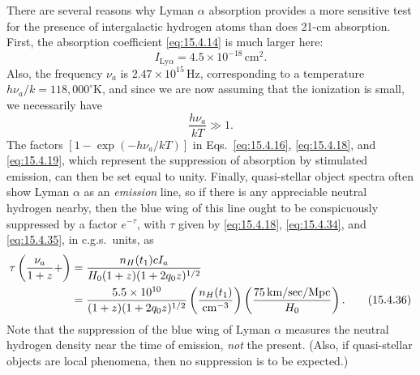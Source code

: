 There are several reasons why Lyman \(\alpha\) absorption provides a more
sensitive test for the presence of intergalactic hydrogen atoms than does
21-cm absorption. First, the absorption coefficient \eqref{eq:15.4.14} is
much larger here:
\begin{equation}
  I_{\mathrm{Ly}\alpha}=4.5\times10^{-18}\,\mathrm{cm^2}.
  \tag{15.4.34}\label{eq:15.4.34}
\end{equation}
Also, the frequency \(\nu_a\) is \(2.47\times10^{15}\,\mathrm{Hz}\),
corresponding to a temperature \(h\nu_a/k=118{,}000^\circ\mathrm{K}\), and
since we are now assuming that the ionization is small, we necessarily have
\begin{equation}
  \frac{h\nu_a}{kT}\gg1.
  \tag{15.4.35}\label{eq:15.4.35}
\end{equation}
The factors \([1-\exp(-h\nu_a/kT)]\) in Eqs.~\eqref{eq:15.4.16},
\eqref{eq:15.4.18}, and \eqref{eq:15.4.19}, which represent the suppression
of absorption by stimulated emission, can then be set equal to unity. Finally,
quasi-stellar object spectra often show Lyman \(\alpha\) as an \emph{emission}
line, so if there is any appreciable neutral hydrogen nearby, then the blue
wing of this line ought to be conspicuously suppressed by a factor \(e^{-\tau}\),
with \(\tau\) given by \eqref{eq:15.4.18}, \eqref{eq:15.4.34}, and
\eqref{eq:15.4.35}, in c.g.s.\ units, as
\begin{align}
  \tau\left(\frac{\nu_a}{1+z}+\right)
  &=
  \frac{n_H(t_1)cI_a}{H_0(1+z)(1+2q_0z)^{1/2}}
  \notag\\
  &=
  \frac{5.5\times10^{10}}{(1+z)(1+2q_0z)^{1/2}}
  \left(\frac{n_H(t_1)}{\mathrm{cm^{-3}}}\right)
  \left(\frac{75\,\mathrm{km/sec/Mpc}}{H_0}\right).
  \tag{15.4.36}\label{eq:15.4.36}
\end{align}
Note that the suppression of the blue wing of Lyman \(\alpha\) measures the
neutral hydrogen density near the time of emission, \emph{not} the present.
(Also, if quasi-stellar objects are local phenomena, then no suppression is to
be expected.)

